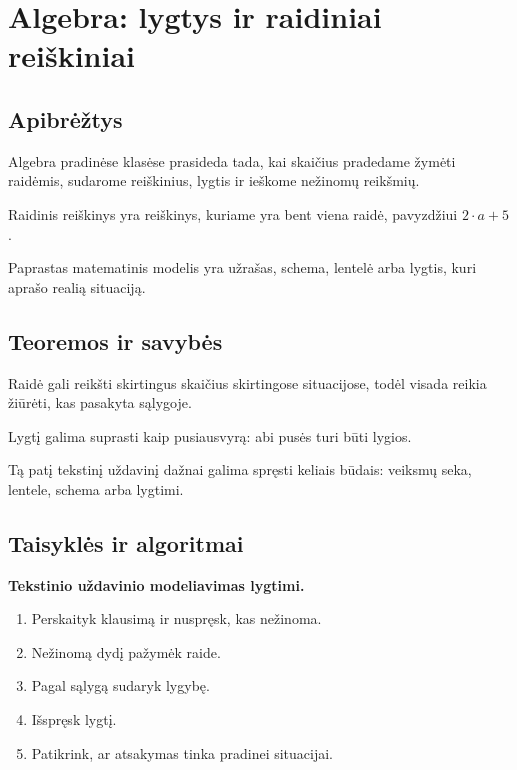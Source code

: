 \section{Algebra: lygtys ir raidiniai reiškiniai}\label{sec:algebra-lygtys-ir-raidiniai-reiskiniai}

\subsection{Apibrėžtys}

\begin{apibreztis}
Algebra pradinėse klasėse prasideda tada, kai skaičius pradedame žymėti raidėmis, sudarome reiškinius, lygtis ir ieškome nežinomų reikšmių.
\end{apibreztis}

\begin{apibreztis}
Raidinis reiškinys yra reiškinys, kuriame yra bent viena raidė, pavyzdžiui \(2\cdot a+5\).
\end{apibreztis}

\begin{apibreztis}
Paprastas matematinis modelis yra užrašas, schema, lentelė arba lygtis, kuri aprašo realią situaciją.
\end{apibreztis}

\subsection{Teoremos ir savybės}

\begin{savybe}
Raidė gali reikšti skirtingus skaičius skirtingose situacijose, todėl visada reikia žiūrėti, kas pasakyta sąlygoje.
\end{savybe}

\begin{savybe}
Lygtį galima suprasti kaip pusiausvyrą: abi pusės turi būti lygios.
\end{savybe}

\begin{savybe}
Tą patį tekstinį uždavinį dažnai galima spręsti keliais būdais: veiksmų seka, lentele, schema arba lygtimi.
\end{savybe}

\subsection{Taisyklės ir algoritmai}

\textbf{Tekstinio uždavinio modeliavimas lygtimi.}
\begin{enumerate}[label=\arabic*.]
\item Perskaityk klausimą ir nuspręsk, kas nežinoma.
\item Nežinomą dydį pažymėk raide.
\item Pagal sąlygą sudaryk lygybę.
\item Išspręsk lygtį.
\item Patikrink, ar atsakymas tinka pradinei situacijai.
\end{enumerate}

